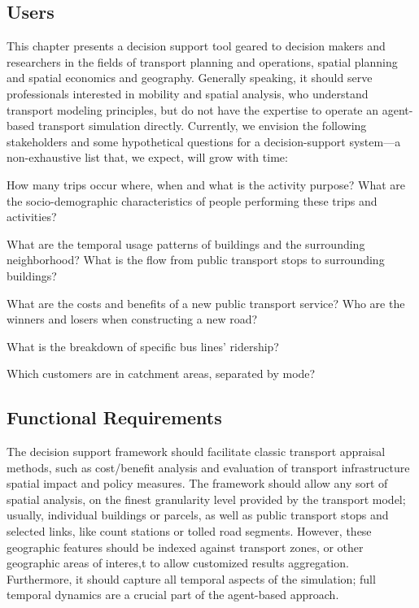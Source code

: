 \subsection{Users}
This chapter presents a decision support tool geared to decision makers and researchers in the fields of transport planning and operations, spatial planning and spatial economics and geography. Generally speaking, it should serve professionals interested in mobility and spatial analysis, who understand transport modeling principles, but do not have the expertise to operate an agent-based transport simulation directly. Currently, we envision the following stakeholders and some hypothetical questions for a decision-support system---a non-exhaustive list that, we expect, will grow with time:
\begin{description}\styleDescription
\item[Transport planners:] How many trips occur where, when and what is the activity purpose?
What are the socio-demographic characteristics of people performing these trips and activities?
\item[Urban Planners:] What are the temporal usage patterns of buildings and the surrounding neighborhood?
What is the flow from public transport stops to surrounding buildings?
\item[Policy-Makers:] What are the costs and benefits of a new public transport service?
Who are the winners and losers when constructing a new road?
\item[Public Transport Operators:] What is the breakdown of specific bus lines' ridership?
\item[Service Industry:] Which customers are in catchment areas, separated by mode?
\end{description}

\subsection{Functional Requirements}
The decision support framework should facilitate classic transport appraisal methods, such as cost/benefit analysis and evaluation of transport infrastructure spatial impact and policy measures. The framework should allow any sort of spatial analysis, on the finest granularity level provided by the transport model; usually, individual buildings or parcels, as well as public transport stops and selected links, like count stations or tolled road segments. However, these geographic features should be indexed against transport zones, or other geographic areas of interes,t to allow customized results aggregation. Furthermore, it should capture all temporal aspects of the simulation; full temporal dynamics are a crucial part of the agent-based approach.


